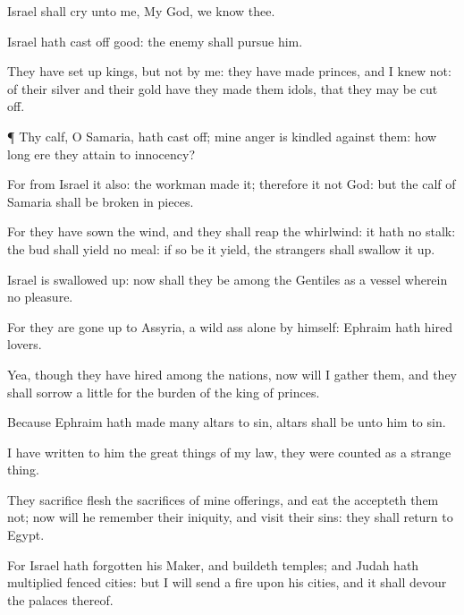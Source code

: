 {Israel shall
cry unto me, My
God, we
know thee.

Israel hath cast
off
{}
good: the
enemy shall
pursue him.

They have set up
kings, but not by me: they have made
princes, and I
knew
{} not: of their
silver and their
gold have they
made them
idols, that they may be cut
off.


\par }{\PP {}¶ Thy
calf, O
Samaria, hath
cast
{} off; mine
anger is
kindled against them: how long
{}
ere they
attain to
innocency?

For from
Israel
{} it also: the
workman
made it; therefore it
{} not
God: but the
calf of
Samaria shall be broken in
pieces.

For they have
sown the
wind, and they shall
reap the
whirlwind: it hath no
stalk: the
bud shall
yield no
meal:
if so be it
yield, the
strangers shall swallow it
up.


\par }{\PP {}Israel is swallowed
up: now shall they be among the
Gentiles as a
vessel wherein
{} no
pleasure.

For they are gone
up to
Assyria, a wild
ass
alone by himself:
Ephraim hath
hired
lovers.

Yea, though they have
hired among the
nations, now will I
gather them, and they shall
sorrow a
little for the
burden of the
king of
princes.

Because
Ephraim hath made
many
altars to
sin,
altars shall be unto him to
sin.

I have
written to him the great
things of my
law,
{} they were
counted as a strange
thing.

They
sacrifice
flesh
{} the
sacrifices of mine
offerings, and
eat
{} the
{}
accepteth them not; now will he
remember their
iniquity, and
visit their
sins: they shall
return to
Egypt.

For
Israel hath
forgotten his
Maker, and
buildeth
temples; and
Judah hath
multiplied
fenced
cities: but I will
send a
fire upon his
cities, and it shall
devour the
palaces thereof.




}
